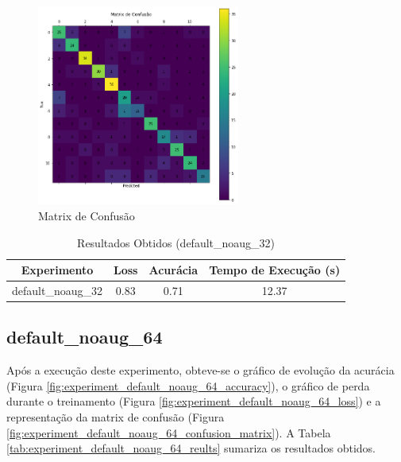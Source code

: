 \documentclass[12pt]{article}
\begin{document}
\begin{figure}[!htb]
  \centering
  \includegraphics[width=18em]{experiments/default_noaug_32/confusion_matrix.png}
  \caption{Matrix de Confusão}
  \label{fig:experiment_default_noaug_32_confusion_matrix}
\end{figure}

\begin{table}[!htb]
  \centering
  \begin{tabular}{|c|c|c|c|}
    \hline
    \textbf{Experimento} & \textbf{Loss} & \textbf{Acurácia} & \textbf{Tempo de Execução (s)} \\ \hline
    default\_noaug\_32   & 0.83          & 0.71              & 12.37                          \\ \hline
  \end{tabular}
  \caption{Resultados Obtidos (default\_noaug\_32)}
  \label{tab:experiment_default_noaug_32_reults}
\end{table}

\newpage

\subsection{default\_noaug\_64}

Após a execução deste experimento, obteve-se o gráfico de evolução da acurácia (Figura \ref{fig:experiment_default_noaug_64_accuracy}), o gráfico de perda durante o treinamento (Figura \ref{fig:experiment_default_noaug_64_loss}) e a representação da matrix de confusão (Figura \ref{fig:experiment_default_noaug_64_confusion_matrix}). A Tabela \ref{tab:experiment_default_noaug_64_reults} sumariza os resultados obtidos.
\end{document}
